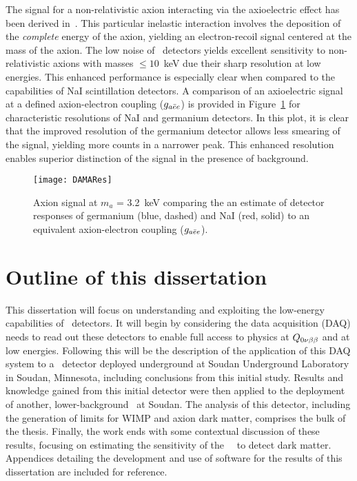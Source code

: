 	The signal for a non-relativistic axion interacting via the axioelectric effect has been derived in~\cite{Pospelov:2008jk}.  This particular inelastic interaction involves the deposition of the \emph{complete} energy of the axion, yielding an electron-recoil signal centered at the mass of the axion.  The low noise of \ppc~detectors yields excellent sensitivity to non-relativistic axions with masses $\leq10$~keV due their sharp resolution at low energies.  This enhanced performance is especially clear when compared to the capabilities of NaI scintillation detectors.  A comparison of an axioelectric signal at a defined axion-electron coupling ($g_{a\bar{e}e}$) is provided in Figure~\ref{fig:ResCompare} for characteristic resolutions of NaI and germanium detectors.  In this plot, it is clear that the improved resolution of the germanium detector allows less smearing of the signal, yielding more counts in a narrower peak.  This enhanced resolution enables superior distinction of the signal in the presence of background.
	
		\begin{figure}
			\centering
			\texttt{[image: DAMARes]}
			\caption[Axion signal at $m_{a}$ = 3.2~keV]{Axion signal at $m_{a}$ = 3.2~keV comparing 
			the an estimate of detector responses of germanium (blue, dashed) and NaI (red, solid) to an equivalent
			axion-electron coupling ($g_{a\bar{e}e}$).}
			\label{fig:ResCompare}
		\end{figure}
	
	\section{Outline of this dissertation}


	This dissertation will focus on understanding and exploiting the low-energy capabilities of \ppc~detectors.  It will begin by considering the data acquisition (DAQ) needs to read out these detectors to enable full access to physics at $Q_{0 \nu \beta \beta}$ and at low energies.  Following this will be the description of the application of this DAQ system to a \ppc~detector deployed underground at Soudan Underground Laboratory in Soudan, Minnesota, including conclusions from this initial study.  Results and knowledge gained from this initial detector were then applied to the deployment of another, lower-background \ppc~at Soudan.  The analysis of this detector, including the generation of limits for WIMP and axion dark matter, comprises the bulk of the thesis.  Finally, the work ends with some contextual discussion of these results, focusing on estimating the sensitivity of the \MJ~\minmod~to detect dark matter.  Appendices detailing the development and use of software for the results of this dissertation are included for reference.
